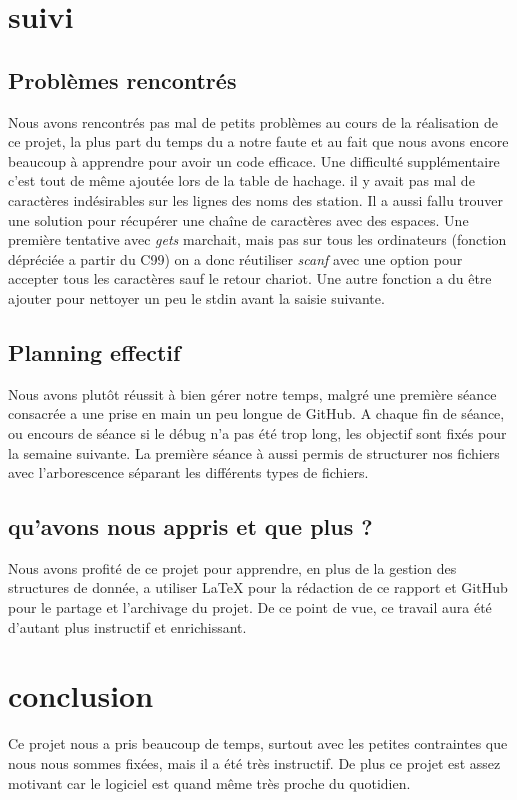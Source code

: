 \documentclass[12pt]{report}
\begin{document}
\chapter{suivi}
\section{Problèmes rencontrés}

Nous avons rencontrés pas mal de petits problèmes au cours de la réalisation de ce projet, la plus part du temps du a notre faute et au fait que nous avons encore beaucoup à apprendre pour avoir un code efficace. Une difficulté supplémentaire c'est tout de même ajoutée lors de la table de hachage. il y avait pas mal de caractères indésirables sur les lignes des noms des station. Il a aussi fallu trouver une solution pour récupérer une chaîne de caractères avec des espaces. Une première tentative avec \emph{gets} marchait, mais pas sur tous les ordinateurs (fonction dépréciée a partir du C99) on a donc réutiliser \emph{scanf} avec une option pour accepter tous les caractères sauf le retour chariot. Une autre fonction a du être ajouter pour nettoyer un peu le stdin avant la saisie suivante.

\section{Planning effectif}

Nous avons plutôt réussit à bien gérer notre temps, malgré une première séance consacrée a une prise en main un peu longue de GitHub. A chaque fin de séance, ou encours de séance si le débug n'a pas été trop long, les objectif sont fixés pour la semaine suivante. \newline La première séance à aussi permis de structurer nos fichiers avec l'arborescence séparant les différents types de fichiers.

\section{qu'avons nous appris et que  plus ?}
Nous avons profité de ce projet pour apprendre, en plus de la gestion des structures de donnée, a utiliser LaTeX pour la rédaction de ce rapport et GitHub pour le partage et l'archivage du projet. De ce point de vue, ce travail aura été d'autant plus instructif et enrichissant.


\chapter{conclusion}

Ce projet nous a pris beaucoup de temps, surtout avec les petites contraintes que nous nous sommes fixées, mais il a été très instructif. De plus ce projet est assez motivant car le logiciel est quand même très proche du quotidien. 
\end{document}
